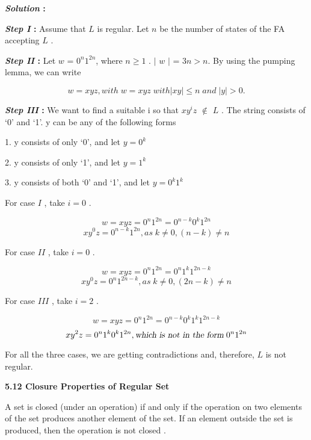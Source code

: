\documentclass[10pt,a4paper]{book}
\begin{document}
\begin{flushleft}
  \textbf{\emph{Solution} :}

\textbf{\emph{Step I} :} Assume that $L$ is regular. Let $n$ be the number of states of the FA accepting $L$ .

\textbf{\emph{Step II} :} Let $w$ = $0^{n} 1^{2n} $, where $ n \geq 1 $ . $|$ $w$ $|$ = $ 3n >n $. By using the pumping lemma, we can write

$$ w = xyz, with \; w = xyz \; with | xy | \leq n \; and \; | y | > 0 . $$

\textbf{\emph{Step III} :} We want to find a suitable \; i\; so that $xy^{i}z$ $\notin$ $L$ . The string consists of ‘0’ and ‘1’. y can be any of the following forms

1. y consists of only ‘0’, and let $y = 0^{k}$

2. y consists of only ‘1’, and let $y = 1^{k}$

3. y consists of both ‘0’ and ‘1’, and let $y = 0^{k} 1^{k}$


For case $I$ , take $i = 0$ .

$$ w = xyz = 0^{n} 1^{2n}= 0^{n-k} 0^{k} 1^{2n} $$
$$ xy^{0}z = 0^{n-k} 1^{2n} , as \; k \neq 0 , (n-k)\neq n $$

For case $II$ , take $i = 0$ .

$$ w = xyz = 0^{n} 1^{2n}= 0^{n} 1^{k} 1^{2n-k} $$
$$ xy^{0}z = 0^{n} 1^{2n-k} , as \; k \neq 0 , (2n-k)\neq n $$

For case $III$ , take $i = 2$ .

$$ w = xyz = 0^{n} 1^{2n}= 0^{n-k} 0^{k} 1^{k} 1^{2n-k} $$
$$ xy^{2}z = 0^{n} 1^{k} 0^{k} 1^{2n} , \textsl{which is not in the form}\; 0^{n} 1^{2n}$$

For all the three cases, we are getting contradictions and, therefore, $L$ is not regular.

\end{flushleft}

\begin{flushleft}
  \textsf{\textbf{5.12 Closure Properties of Regular Set}}

  A set is closed (under an operation) if and only if the operation on two elements of the set produces
another element of the set. If an element outside the set is produced, then the operation is not closed .
\end{flushleft}
\end{document}
